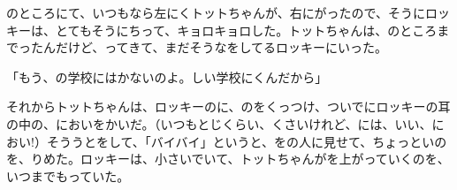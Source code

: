 のところにて、いつもなら左にくトットちゃんが、右にがったので、そうにロッキーは、とてもそうにちって、キョロキョロした。トットちゃんは、のところまでったんだけど、ってきて、まだそうなをしてるロッキーにいった。

「もう、の学校にはかないのよ。しい学校にくんだから」

それからトットちゃんは、ロッキーのに、のをくっつけ、ついでにロッキーの耳の中の、においをかいだ。（いつもとじくらい、くさいけれど、には、いい、におい!）そううとをして、「バイバイ」というと、をの人に見せて、ちょっといのを、りめた。ロッキーは、小さいでいて、トットちゃんがを上がっていくのを、いつまでもっていた。


